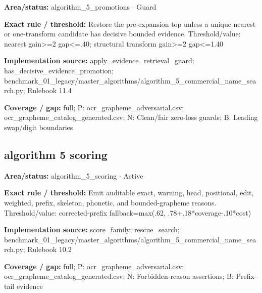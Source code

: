 \begin{tcolorbox}[enhanced,breakable,colback=white,colframe=Muted!45,boxrule=0.45pt,arc=1.5pt,left=6pt,right=6pt,top=5pt,bottom=5pt,title={\texttt{A5-EVIDENCE-GUARD-19}},title after break={\texttt{A5-EVIDENCE-GUARD-19}\ (continued)},fonttitle=\headingfont\bfseries\color{Navy},coltitle=Navy]
\textbf{Area/status:} algorithm\_\allowbreak{}5\_\allowbreak{}promotions $\boldsymbol{\cdot}$ Guard\par
\smallskip
\textbf{Exact rule / threshold:} Restore the pre-expansion top unless a unique nearest or one-transform candidate has decisive bounded evidence. Threshold/\allowbreak{}value: nearest gain>=2 gap<=.40; structural transform gain>=2 gap<=1.40\par
\smallskip
\textbf{Implementation source:} apply\_\allowbreak{}evidence\_\allowbreak{}retrieval\_\allowbreak{}guard; has\_\allowbreak{}decisive\_\allowbreak{}evidence\_\allowbreak{}promotion; benchmark\_\allowbreak{}01\_\allowbreak{}legacy/\allowbreak{}master\_\allowbreak{}algorithms/\allowbreak{}algorithm\_\allowbreak{}5\_\allowbreak{}commercial\_\allowbreak{}name\_\allowbreak{}search.py; Rulebook 11.4\par
\smallskip
\textbf{Coverage / gap:} full; P: ocr\_\allowbreak{}grapheme\_\allowbreak{}adversarial.csv; ocr\_\allowbreak{}grapheme\_\allowbreak{}catalog\_\allowbreak{}generated.csv; N: Clean/\allowbreak{}fair zero-loss guards; B: Leading swap/\allowbreak{}digit boundaries
\end{tcolorbox}
\medskip
\subsection*{algorithm 5 scoring}
\begin{tcolorbox}[enhanced,breakable,colback=white,colframe=Muted!45,boxrule=0.45pt,arc=1.5pt,left=6pt,right=6pt,top=5pt,bottom=5pt,title={\texttt{A5-EVIDENCE-REASONS-15}},title after break={\texttt{A5-EVIDENCE-REASONS-15}\ (continued)},fonttitle=\headingfont\bfseries\color{Navy},coltitle=Navy]
\textbf{Area/status:} algorithm\_\allowbreak{}5\_\allowbreak{}scoring $\boldsymbol{\cdot}$ Active\par
\smallskip
\textbf{Exact rule / threshold:} Emit auditable exact, warning, head, positional, edit, weighted, prefix, skeleton, phonetic, and bounded-grapheme reasons. Threshold/\allowbreak{}value: corrected-prefix fallback=max(.62, .78+.18*coverage-.10*cost)\par
\smallskip
\textbf{Implementation source:} score\_\allowbreak{}family; rescue\_\allowbreak{}search; benchmark\_\allowbreak{}01\_\allowbreak{}legacy/\allowbreak{}master\_\allowbreak{}algorithms/\allowbreak{}algorithm\_\allowbreak{}5\_\allowbreak{}commercial\_\allowbreak{}name\_\allowbreak{}search.py; Rulebook 10.2\par
\smallskip
\textbf{Coverage / gap:} full; P: ocr\_\allowbreak{}grapheme\_\allowbreak{}adversarial.csv; ocr\_\allowbreak{}grapheme\_\allowbreak{}catalog\_\allowbreak{}generated.csv; N: Forbidden-reason assertions; B: Prefix-tail evidence
\end{tcolorbox}
\medskip
